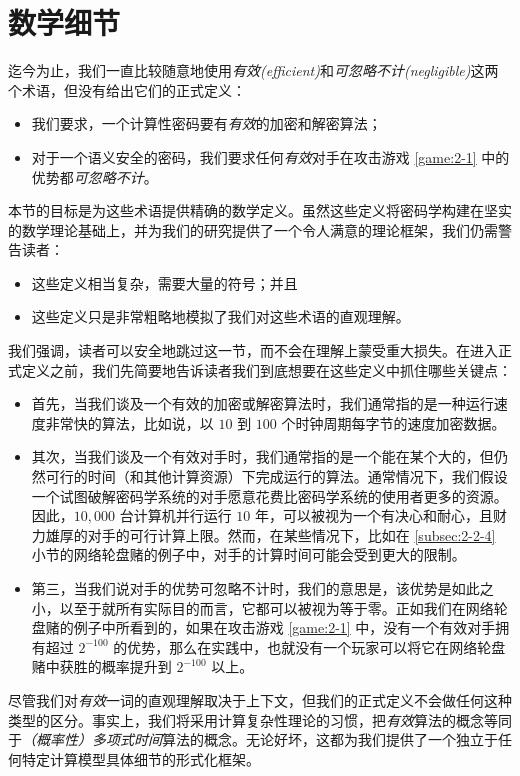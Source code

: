 \section{数学细节}\label{sec:2-3}

迄今为止，我们一直比较随意地使用\emph{有效(efficient)}和\emph{可忽略不计(negligible)}这两个术语，但没有给出它们的正式定义：
\begin{itemize}
	\item 我们要求，一个计算性密码要有\emph{有效}的加密和解密算法；
	\item 对于一个语义安全的密码，我们要求任何\emph{有效}对手在攻击游戏 \ref{game:2-1} 中的优势都\emph{可忽略不计}。
\end{itemize}
本节的目标是为这些术语提供精确的数学定义。虽然这些定义将密码学构建在坚实的数学理论基础上，并为我们的研究提供了一个令人满意的理论框架，我们仍需警告读者：
\begin{itemize}
	\item 这些定义相当复杂，需要大量的符号；并且
	\item 这些定义只是非常粗略地模拟了我们对这些术语的直观理解。
\end{itemize}
我们强调，读者可以安全地跳过这一节，而不会在理解上蒙受重大损失。在进入正式定义之前，我们先简要地告诉读者我们到底想要在这些定义中抓住哪些关键点：
\begin{itemize}
	\item 首先，当我们谈及一个有效的加密或解密算法时，我们通常指的是一种运行速度非常快的算法，比如说，以 $10$ 到 $100$ 个时钟周期每字节的速度加密数据。
	\item 其次，当我们谈及一个有效对手时，我们通常指的是一个能在某个大的，但仍然可行的时间（和其他计算资源）下完成运行的算法。通常情况下，我们假设一个试图破解密码学系统的对手愿意花费比密码学系统的使用者更多的资源。因此，$10,000$ 台计算机并行运行 $10$ 年，可以被视为一个有决心和耐心，且财力雄厚的对手的可行计算上限。然而，在某些情况下，比如在 \ref{subsec:2-2-4} 小节的网络轮盘赌的例子中，对手的计算时间可能会受到更大的限制。
	\item 第三，当我们说对手的优势可忽略不计时，我们的意思是，该优势是如此之小，以至于就所有实际目的而言，它都可以被视为等于零。正如我们在网络轮盘赌的例子中所看到的，如果在攻击游戏 \ref{game:2-1} 中，没有一个有效对手拥有超过 $2^{-100}$ 的优势，那么在实践中，也就没有一个玩家可以将它在网络轮盘赌中获胜的概率提升到 $2^{-100}$ 以上。
\end{itemize}

尽管我们对\emph{有效}一词的直观理解取决于上下文，但我们的正式定义不会做任何这种类型的区分。事实上，我们将采用计算复杂性理论的习惯，把\emph{有效}算法的概念等同于\emph{（概率性）多项式时间}算法的概念。无论好坏，这都为我们提供了一个独立于任何特定计算模型具体细节的形式化框架。

